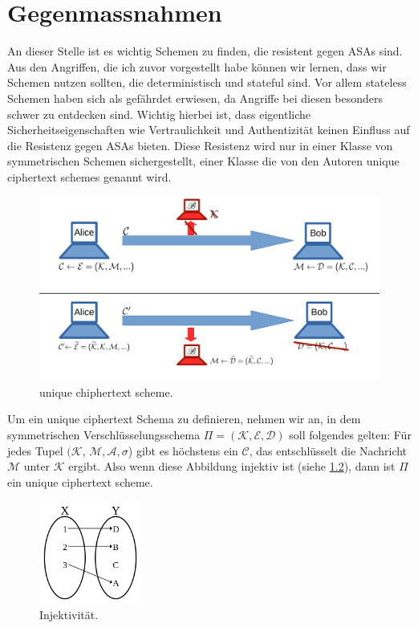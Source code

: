 \chapter{Gegenmassnahmen}
\label{ch:Gegenmassnahmen}

An dieser Stelle ist es wichtig Schemen zu finden, die resistent gegen ASAs sind. Aus den Angriffen, die ich zuvor vorgestellt habe können wir lernen, dass wir Schemen nutzen sollten, die deterministisch und stateful sind. Vor allem stateless Schemen haben sich als gefährdet erwiesen, da Angriffe bei diesen besonders schwer zu entdecken sind. Wichtig hierbei ist, dass eigentliche Sicherheitseigenschaften wie Vertraulichkeit und Authentizität keinen Einfluss auf die Resistenz gegen ASAs bieten. Diese Resistenz wird nur in einer Klasse von symmetrischen Schemen sichergestellt, einer Klasse die von den Autoren unique ciphertext schemes genannt wird.

\begin{figure}[!ht]
	\centering
	\includegraphics[width=\textwidth]{image/unique}
	\caption{unique chiphertext scheme.}
	\label{fig:unique}
\end{figure}

Um ein unique ciphertext Schema zu definieren, nehmen wir an, in dem symmetrischen Verschlüsselungsschema $\Pi = (\mathcal{K}, \mathcal{E}, \mathcal{D})$ soll folgendes gelten: Für jedes Tupel $(\mathcal{K}$, $\mathcal{M}, \mathcal{A}, \sigma$) gibt es höchstens ein $\mathcal{C}$, das entschlüsselt die Nachricht $\mathcal{M}$ unter $\mathcal{K}$ ergibt. Also wenn diese Abbildung injektiv ist (siehe \ref{fig:injektiv}), dann ist $\Pi$ ein unique ciphertext scheme.

\begin{figure}[!ht]
	\centering
	\includegraphics[width=0.3\textwidth]{image/Injection}
	\caption{Injektivität.}
	\label{fig:injektiv}
\end{figure}

